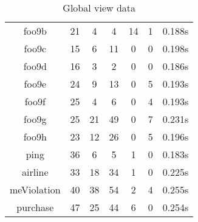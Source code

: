 \begin{table}[!ht]
\begin{tabular}{|c|c|c|c|c|c|c|}
foo9b & 21 & 4 & 4 & 14 & 1 & 0.188s \\ 
foo9c & 15 & 6 & 11 & 0 & 0 & 0.198s \\ 
foo9d & 16 & 3 & 2 & 0 & 0 & 0.186s \\ 
foo9e & 24 & 9 & 13 & 0 & 5 & 0.193s \\ 
foo9f & 25 & 4 & 6 & 0 & 4 & 0.193s \\ 
foo9g & 25 & 21 & 49 & 0 & 7 & 0.231s \\ 
foo9h & 23 & 12 & 26 & 0 & 5 & 0.196s \\ 
ping & 36 & 6 & 5 & 1 & 0 & 0.183s \\ 
airline & 33 & 18 & 34 & 1 & 0 & 0.225s \\ 
meViolation & 40 & 38 & 54 & 2 & 4 & 0.255s \\ 
purchase & 47 & 25 & 44 & 6 & 0 & 0.254s \\ 
\hline
\end{tabular}
\caption{Global view data}
\label{tab:gvbench}
\end{table}
